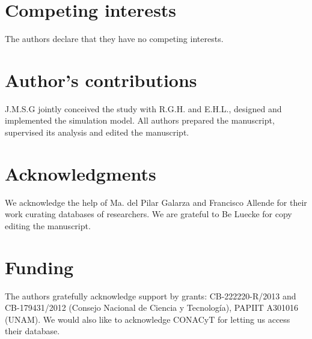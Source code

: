 \documentclass{bmcart}
\begin{document}

\begin{backmatter}

\section*{Competing interests}
  The authors declare that they have no competing interests.

\section*{Author's contributions}
    J.M.S.G jointly conceived the study with  R.G.H. and E.H.L., designed and
    implemented the simulation model. All authors prepared the manuscript,
    supervised its analysis and edited the manuscript. 

\section*{Acknowledgments}

We acknowledge the help of Ma. del Pilar Galarza and Francisco Allende
for their work curating databases of researchers. We are grateful to
Be Luecke for copy editing the manuscript.

\section*{Funding}
  The authors gratefully acknowledge support by grants: CB-222220-R/2013 and
CB-179431/2012 (Consejo Nacional de Ciencia y Tecnolog\'ia), PAPIIT A301016 (UNAM). We would also like
to acknowledge CONACyT for letting us access their database.


\end{backmatter}
\end{document}
